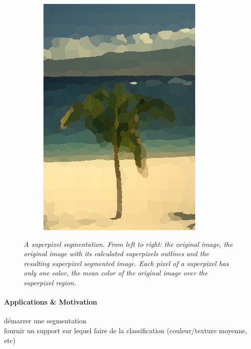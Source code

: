 \documentclass{article}
\begin{document}
\begin{figure}[!ht]
\begin{subfigure}{.3\linewidth}
                \includegraphics[width=0.9\linewidth]{pics/img_spp3.png}
            \end{subfigure}
                \caption{\textit{A superpixel segmentation. From left to right: the original image, the original image with its calculated superpixels outlines and the resulting superpixel segmented image. Each pixel of a superpixel has only one color, the mean color of the original image over the superpixel region.}}
                \label{fig:spp}
            \end{figure}

            \paragraph{Applications \& Motivation}
            démarrer une segmentation\\
            fournir un support sur lequel faire de la classification (couleur/texture moyenne, etc)
\end{document}
